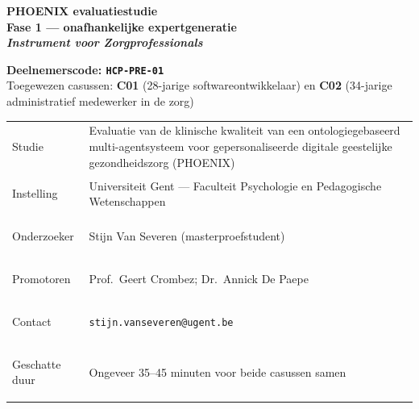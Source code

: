 \documentclass[11pt,a4paper]{article}
\renewcommand{\arraystretch}{1.28}
\begin{document}
\begin{titlepage}
\centering\vspace*{0.6cm}

\begin{tcolorbox}[
  colback=DarkBlue,colframe=DarkBlue,
  arc=3mm,left=14pt,right=14pt,top=12pt,bottom=12pt,
  width=\textwidth
]
\centering
{\fontsize{22}{28}\selectfont\bfseries\color{white}
PHOENIX evaluatiestudie\\[0.3em]
\fontsize{15}{20}\selectfont\color{AccentBlue}
Fase 1 --- onafhankelijke expertgeneratie\\[0.2em]
\fontsize{12}{16}\selectfont\color{white}
\textit{Instrument voor Zorgprofessionals}
}
\end{tcolorbox}

\vspace{0.7cm}

\begin{tcolorbox}[
  colback=AccentBlue,colframe=PrimaryBlue,
  arc=2.5mm,boxrule=1.2pt,left=12pt,right=12pt,top=10pt,bottom=10pt,
  width=0.86\textwidth
]
\centering
{\large\bfseries\color{DarkBlue}Deelnemerscode: \texttt{HCP-PRE-01}}\\[0.5em]
{\normalsize\color{SlateMid}
Toegewezen casussen:\quad
\textbf{\color{PrimaryBlue}C01} (28-jarige softwareontwikkelaar)
\quad en \quad
\textbf{\color{PrimaryBlue}C02} (34-jarige administratief medewerker in de zorg)
}
\end{tcolorbox}

\vspace{0.6cm}

\begin{tcolorbox}[
  colback=SoftBG,colframe=BorderGrey,
  arc=2mm,left=10pt,right=10pt,top=9pt,bottom=9pt,
  width=0.92\textwidth
]
\small\renewcommand{\arraystretch}{1.28}
\begin{tabularx}{\textwidth}{@{}>{\bfseries\raggedright\arraybackslash}p{}X@{}}
Studie & Evaluatie van de klinische kwaliteit van een ontologiegebaseerd multi-agentsysteem voor gepersonaliseerde digitale geestelijke gezondheidszorg (PHOENIX) \\
Instelling & Universiteit Gent --- Faculteit Psychologie en Pedagogische Wetenschappen \\
Onderzoeker & Stijn Van Severen (masterproefstudent) \\
Promotoren & Prof.\ Geert Crombez; Dr.\ Annick De Paepe \\
Contact & \texttt{stijn.vanseveren@ugent.be} \\
Geschatte duur & Ongeveer 35--45 minuten voor beide casussen samen \\
\end{tabularx}
\end{tcolorbox}


\end{titlepage}
\end{document}
